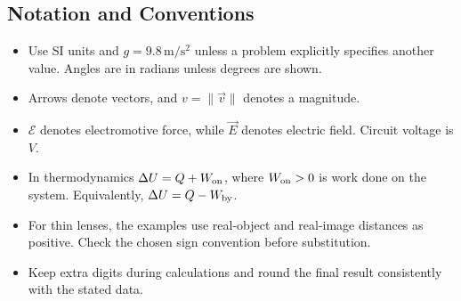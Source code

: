 \subsection*{Notation and Conventions}
\begin{itemize}[leftmargin=*]
  \item Use SI units and $g=9.8\,\mathrm{m/s^2}$ unless a problem explicitly specifies another value. Angles are in radians unless degrees are shown.
  \item Arrows denote vectors, and $v=\lVert\vec v\rVert$ denotes a magnitude.
  \item $\mathcal E$ denotes electromotive force, while $\vec E$ denotes electric field. Circuit voltage is $V$.
  \item In thermodynamics $\Delta U=Q+W_{\rm on}$, where $W_{\rm on}>0$ is work done on the system. Equivalently, $\Delta U=Q-W_{\rm by}$.
  \item For thin lenses, the examples use real-object and real-image distances as positive. Check the chosen sign convention before substitution.
  \item Keep extra digits during calculations and round the final result consistently with the stated data.
\end{itemize}
